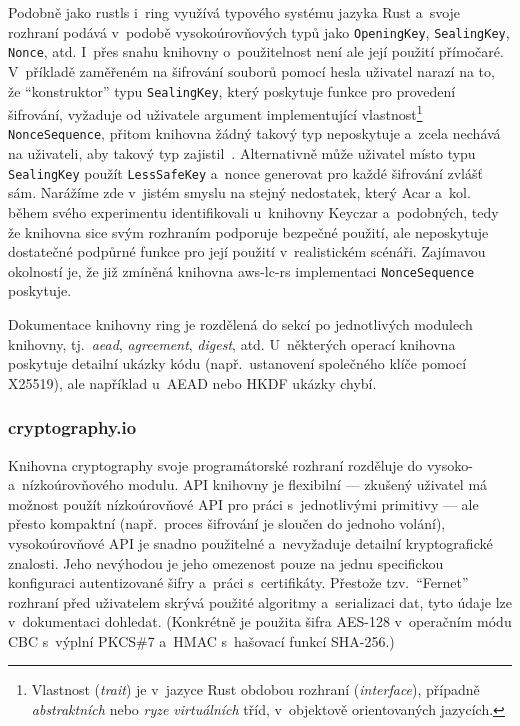 Podobně jako rustls i~ring využívá typového systému jazyka Rust a~svoje rozhraní podává v~podobě vysokoúrovňových typů jako \texttt{OpeningKey}, \texttt{SealingKey}, \texttt{Nonce}, atd. I~přes snahu knihov\-ny o~použitelnost není ale její použití přímočaré. V~příkladě zaměřeném na šifrování souborů pomocí hesla uživatel narazí na to, že ``konstruktor'' typu \texttt{SealingKey}, který poskytuje funkce pro provedení šifrování, vyžaduje od uživatele argument implementující vlastnost\footnote{Vlastnost (\textit{trait}) je v~jazyce Rust obdobou rozhraní (\textit{interface}), případně \textit{abstraktních} nebo \textit{ryze virtuálních} tříd, v~objektově orientovaných jazycích.} \texttt{NonceSequence}, přitom knihovna žádný takový typ neposkytuje a~zcela nechává na uživateli, aby takový typ zajistil~\cite{ring-noncesequence-issue}. Alternativně může uživatel místo typu \texttt{SealingKey} použít \texttt{LessSafeKey} a~nonce generovat pro každé šifrování zvlášť sám. Narážíme zde v~jistém smyslu na stejný nedostatek, který Acar a~kol.~\cite{comparing2017} během svého experimentu identifikovali u~knihovny Keyczar a~podobných, tedy že knihovna sice svým rozhraním podporuje bezpečné použití, ale neposkytuje dostatečné podpůrné funkce pro její použití v~realistickém scénáři. Zajímavou okolností je, že již zmíněná knihovna aws-lc-rs implementaci \texttt{NonceSequence} poskytuje.

Dokumentace knihovny ring je rozdělená do sekcí po jednotlivých modulech knihov\-ny, tj.~\textit{aead}, \textit{agreement}, \textit{digest}, atd. U~některých operací knihovna poskytuje detailní ukázky kódu (např.\ ustanovení společného klíče pomocí X25519), ale například u~AEAD nebo HKDF ukázky chybí.

\subsubsection*{cryptography.io}

Knihovna cryptography svoje programátorské rozhraní rozděluje do vysoko- a~nízkoúrovňového modulu. API knihovny je flexibilní --- zkušený uživatel má možnost použít nízkoúrovňové API pro práci s~jednotlivými primitivy --- ale přesto kompaktní (např.\ proces šifrování je sloučen do jednoho volání), vysokoúrovňové API je snadno použitelné a~nevyžaduje detailní kryptografické znalosti. Jeho nevýhodou je jeho omezenost pouze na jednu specifickou konfiguraci autentizované šifry a~práci s~certifikáty. Přestože tzv.~``Fernet'' rozhraní před uživatelem skrývá použité algoritmy a~serializaci dat, tyto údaje lze v~dokumentaci dohledat. (Konkrétně je použita šifra AES-128 v~operačním módu CBC s~výplní PKCS\#7 a~HMAC s~hašovací funkcí SHA-256.)

